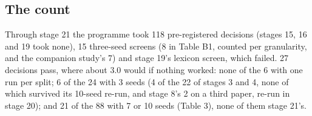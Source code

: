 \documentclass[11pt,a4paper]{article}
\begin{document}
\hypertarget{the-count}{%
\subsection{The count}\label{the-count}}

Through stage 21 the programme took 118 pre-registered decisions (stages
15, 16 and 19 took none), 15 three-seed screens (8 in Table B1, counted
per granularity, and the companion study's 7) and stage 19's lexicon
screen, which failed. 27 decisions pass, where about 3.0 would if nothing
worked: none of the 6 with one run per split; 6 of the 24 with 3 seeds (4
of the 22 of stages 3 and 4, none of which survived its 10-seed re-run,
and stage 8's 2 on a third paper, re-run in stage 20); and 21 of the 88
with 7 or 10 seeds (Table 3), none of them stage 21's.
\end{document}
